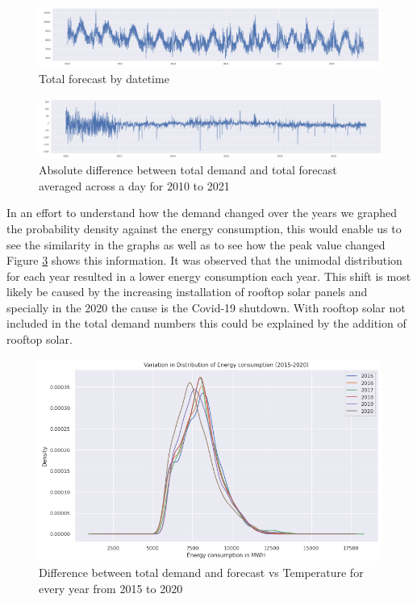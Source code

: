 \documentclass[mstat,12pt]{unswthesis}
\begin{document}
\begin{figure}[H]
\includegraphics[width=140mm]{image32.png}
\caption{Total forecast by datetime}
\label{image32}
\end{figure}

\begin{figure}[H]
\includegraphics[width=140mm]{image63.jpeg}
\caption{Absolute difference between total demand and total forecast averaged across a day for 2010 to 2021}
\label{image63}
\end{figure}

In an effort to understand how the demand changed over the years we
graphed the probability density against the energy consumption, this
would enable us to see the similarity in the graphs as well as to see
how the peak value changed Figure \ref{image17} shows this information.
It was observed that the unimodal distribution for each year resulted in
a lower energy consumption each year. This shift is most likely be
caused by the increasing installation of rooftop solar panels and
specially in the 2020 the cause is the Covid-19 shutdown. With rooftop
solar not included in the total demand numbers this could be explained
by the addition of rooftop solar.

\begin{figure}[H]
\includegraphics[width=140mm]{image17.png}
\caption{Difference between total demand and forecast vs Temperature for every year from 2015 to 2020}
\label{image17}
\end{figure}
\end{document}
